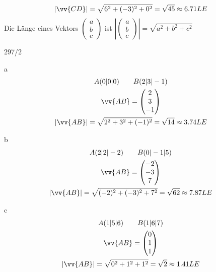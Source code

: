 \begin{gather*}
  |\vv{CD}| = \sqrt{6^2 + (-3)^2 + 0^2} = \sqrt{45} \approx 6.71LE
\end{gather*}
Die Länge eines Vektors $\begin{pmatrix}a \\ b \\ c\end{pmatrix}$ ist $\left|\begin{pmatrix}a \\ b \\ c\end{pmatrix}\right| = \sqrt{a^2 + b^2 + c^2}$
\begin{exercise}{297/2}
  \item [a]
  \begin{gather*}
    A(0|0|0) \qquad B(2|3|-1) \\
    \vv{AB} = \begin{pmatrix}2 \\ 3 \\ -1\end{pmatrix} \\
    |\vv{AB}| = \sqrt{2^2 + 3^2 + (-1)^2} = \sqrt{14} \approx 3.74LE
  \end{gather*}
  \item [b]
  \begin{gather*}
    A(2|2|-2) \qquad B(0|-1|5) \\
    \vv{AB} = \begin{pmatrix}-2 \\ -3 \\ 7\end{pmatrix} \\
    |\vv{AB}| = \sqrt{(-2)^2 + (-3)^2 + 7^2} = \sqrt{62} \approx 7.87LE
  \end{gather*}
  \item [c]
  \begin{gather*}
    A(1|5|6) \qquad B(1|6|7) \\
    \vv{AB} = \begin{pmatrix}0 \\ 1 \\ 1\end{pmatrix} \\
    |\vv{AB}| = \sqrt{0^2 + 1^2 + 1^2} = \sqrt{2} \approx 1.41LE
  \end{gather*}
\end{exercise}
